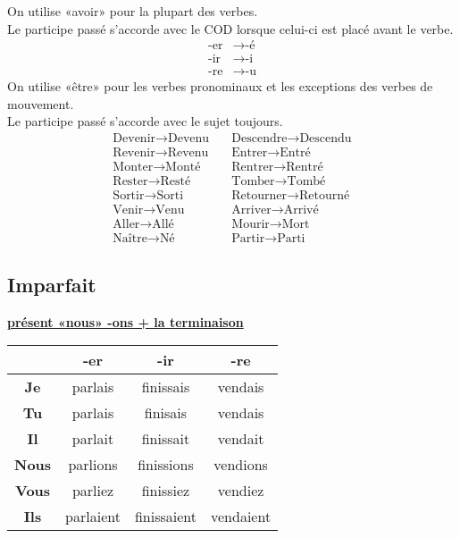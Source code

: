 \documentclass[12pt, a4paper]{article}
\begin{document}
\begin{multicols*}{3}
On utilise «avoir» pour la plupart des verbes.\\Le participe passé s'accorde avec le COD lorsque celui-ci est placé avant le verbe.
\begin{align*}
  \text{-er} &\rightarrow \text{-é}\\
  \text{-ir} &\rightarrow \text{-i}\\
  \text{-re} &\rightarrow \text{-u}
\end{align*}
On utilise «être» pour les verbes pronominaux et les exceptions des verbes de mouvement.\\Le participe passé s'accorde avec le sujet toujours.
\begin{align*}
  \text{Devenir} \rightarrow \text{Devenu} &\quad \text{Descendre} \rightarrow \text{Descendu}\\
  \text{Revenir} \rightarrow \text{Revenu} &\quad \text{Entrer} \rightarrow \text{Entré}\\
  \text{Monter} \rightarrow \text{Monté} &\quad \text{Rentrer} \rightarrow \text{Rentré}\\
  \text{Rester} \rightarrow \text{Resté} &\quad \text{Tomber} \rightarrow \text{Tombé}\\
  \text{Sortir} \rightarrow \text{Sorti} &\quad \text{Retourner} \rightarrow \text{Retourné}\\
  \text{Venir} \rightarrow \text{Venu} &\quad \text{Arriver} \rightarrow \text{Arrivé}\\
  \text{Aller} \rightarrow \text{Allé} &\quad \text{Mourir} \rightarrow \text{Mort}\\
  \text{Naître} \rightarrow \text{Né} &\quad \text{Partir} \rightarrow \text{Parti}
\end{align*}
\colbreak

\subsection{Imparfait}
\begin{center}
\underline{\textbf{présent «nous» -ons + la terminaison}}
\begin{tabular}{|c|c|c|c|}
  \hline
  & \textbf{-er} & \textbf{-ir} & \textbf{-re}\\\hline
  \textbf{Je} & parlais & finissais & vendais \\\hline
  \textbf{Tu} & parlais & finisais & vendais \\\hline
  \textbf{Il} & parlait & finissait & vendait \\\hline
  \textbf{Nous} & parlions & finissions & vendions \\\hline
  \textbf{Vous} & parliez & finissiez & vendiez \\\hline
  \textbf{Ils} & parlaient & finissaient & vendaient \\\hline
\end{tabular}
\end{center}


\end{multicols*}
\end{document}
